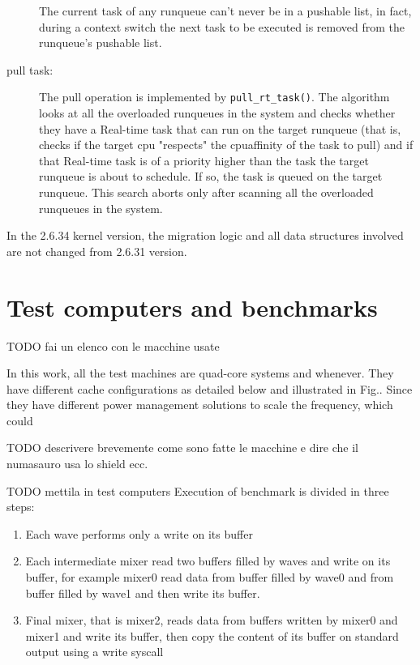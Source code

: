 \begin{description}
\lstset{basicstyle=\footnotesize, language=c, captionpos=b, frame=single, label=lis:steps}


The current task of any runqueue can't never be in a pushable list, in fact, during a context switch the next task to be executed is removed from the 
runqueue's pushable list.

\item[pull task:] The pull operation is implemented by \texttt{pull\_rt\_task()}. The algorithm looks at all the overloaded runqueues in the system 
and checks whether they have a Real-time task that can run on the target runqueue (that is, checks if the target cpu "respects" the cpuaffinity of the 
task to pull) and if that Real-time task is of a priority higher than the task the target runqueue is about to schedule. If so, the task is queued on 
the target runqueue. This search aborts only after scanning all the overloaded runqueues in the system. 

\end{description}

In the 2.6.34 kernel version, the migration logic and all data structures involved are not changed from 2.6.31 version.

\section{Test computers and benchmarks}

TODO fai un elenco con le macchine usate

In this work, all the test machines are quad-core 
systems and whenever. They have different cache configurations
as detailed below and illustrated in Fig.. Since they have different
power management solutions to scale the frequency, which could

TODO descrivere brevemente come sono fatte le macchine e dire che il numasauro usa lo shield ecc.

TODO mettila in test computers
Execution of benchmark is divided in three steps:

\begin{enumerate}
\item Each wave performs only a write on its buffer
\item Each intermediate mixer read two buffers filled by waves and write on its buffer, for example mixer0 read data from buffer filled by wave0 and from 
buffer filled by wave1 and then write its buffer.
\item Final mixer, that is mixer2, reads data from buffers written by mixer0 and mixer1 and write its buffer, then copy the content of its buffer on 
standard output using a write syscall
\end{enumerate}

